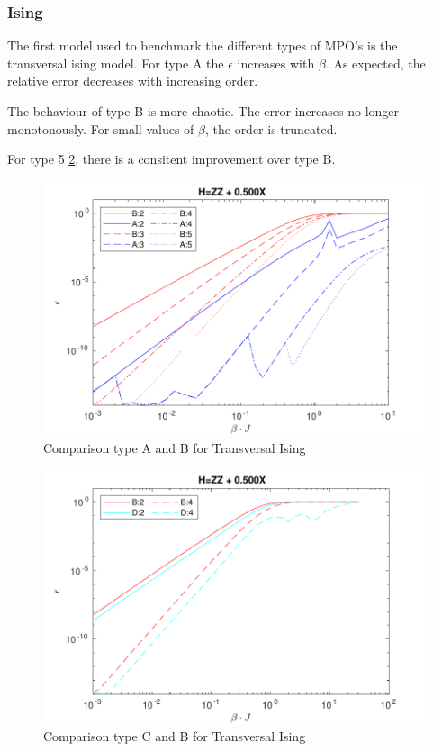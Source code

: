 \subsubsection{Ising}

The first model used to benchmark the different types of MPO's is the transversal ising model. For type A the $\epsilon$ increases with
$\beta$. As expected, the relative error decreases with increasing order.

The behaviour of type B is more chaotic. The error increases no longer monotonously. For small values of $\beta$, the order is truncated.

For type 5 \cref{bench:ising5}, there is a consitent improvement over type B. 

\begin{figure}[H]
    \center
    \includegraphics[width=\textwidth]{Figuren/benchmarking/t_ising.pdf}
    \caption{Comparison type A and B for Transversal Ising}
    \label{fig:benchmark:tising}
\end{figure}

\begin{figure}[H]
    \center
    \includegraphics[width=\textwidth]{Figuren/benchmarking/type5/ising.pdf}
    \caption{Comparison type C and B for Transversal Ising}
    \label{bench:ising5}
\end{figure}

